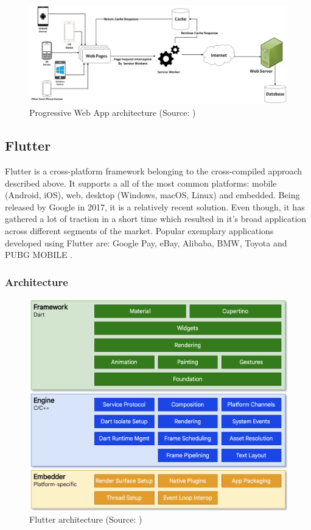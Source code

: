 \begin{figure}[h]
	\centering
	\includegraphics[width=\textwidth]{img/pwa}
	\caption{Progressive Web App architecture (Source: \cite{dawning_pwa})}
	\label{fig:pwa_architecture}
\end{figure}

\subsection{Flutter}

Flutter is a cross-platform framework belonging to the cross-compiled approach described above. It supports a all of the most common platforms: mobile (Android, iOS), web, desktop (Windows, macOS, Linux) and embedded. Being released by Google in 2017, it is a relatively recent solution. Even though, it has gathered a lot of traction in a short time which resulted in it's broad application across different segments of the market. Popular exemplary applications developed using Flutter are: Google Pay, eBay, Alibaba, BMW, Toyota and PUBG MOBILE \cite{flutter_showcase,flutter_docs_architecture}.

\subsubsection*{Architecture}

\begin{figure}[h]
	\centering
	\includegraphics[width=.77\textwidth]{img/flutter_architecture}
	\caption{Flutter architecture (Source: \cite{flutter_docs_architecture})}
	\label{fig:flutter_architecture}
\end{figure}


